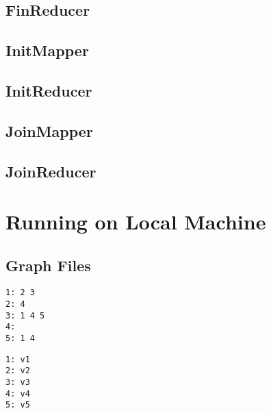 \documentclass{homework}
\begin{document}
\newpage
\subsection{FinReducer}


\newpage
\subsection{InitMapper}


\newpage
\subsection{InitReducer}


\newpage
\subsection{JoinMapper}


\newpage
\subsection{JoinReducer}


\newpage
\section{Running on Local Machine}

\subsection{Graph Files} 

\begin{lstlisting}[caption={sample.txt}]
1: 2 3 
2: 4
3: 1 4 5
4: 
5: 1 4
\end{lstlisting}

\begin{lstlisting}[caption={names.txt}]
1: v1 
2: v2
3: v3
4: v4
5: v5
\end{lstlisting}
\end{document}

